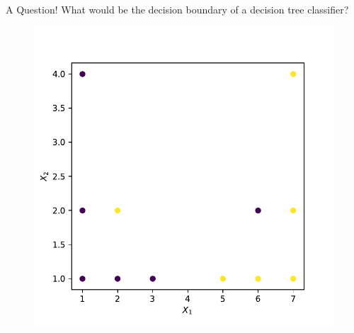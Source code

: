\documentclass[aspectratio=169,10pt]{beamer}
\newcommand{\fitpic}[1]{\begin{adjustbox}{max width=\linewidth, max totalheight=0.78\textheight}#1\end{adjustbox}}
\begin{document}
\begin{frame}{A Question!}
	What would be the decision boundary of a decision tree classifier? 
		
	\begin{figure}
		\centering
	\fitpic{\includegraphics[scale=0.55]{dataset-1}}
	\end{figure}


	\end{frame}
\end{document}

